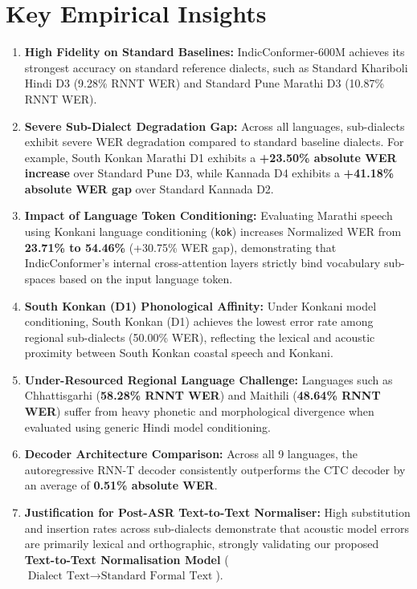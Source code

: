 \documentclass[10pt]{article}
\begin{document}
\section*{Key Empirical Insights}

\begin{enumerate}
  \item \textbf{High Fidelity on Standard Baselines:} IndicConformer-600M achieves its strongest accuracy on standard reference dialects, such as Standard Khariboli Hindi D3 (9.28\% RNNT WER) and Standard Pune Marathi D3 (10.87\% RNNT WER).
  \item \textbf{Severe Sub-Dialect Degradation Gap:} Across all languages, sub-dialects exhibit severe WER degradation compared to standard baseline dialects. For example, South Konkan Marathi D1 exhibits a \textbf{+23.50\% absolute WER increase} over Standard Pune D3, while Kannada D4 exhibits a \textbf{+41.18\% absolute WER gap} over Standard Kannada D2.
  \item \textbf{Impact of Language Token Conditioning:} Evaluating Marathi speech using Konkani language conditioning (\texttt{kok}) increases Normalized WER from \textbf{23.71\% to 54.46\%} (+30.75\% WER gap), demonstrating that IndicConformer's internal cross-attention layers strictly bind vocabulary sub-spaces based on the input language token.
  \item \textbf{South Konkan (D1) Phonological Affinity:} Under Konkani model conditioning, South Konkan (D1) achieves the lowest error rate among regional sub-dialects (50.00\% WER), reflecting the lexical and acoustic proximity between South Konkan coastal speech and Konkani.
  \item \textbf{Under-Resourced Regional Language Challenge:} Languages such as Chhattisgarhi (\textbf{58.28\% RNNT WER}) and Maithili (\textbf{48.64\% RNNT WER}) suffer from heavy phonetic and morphological divergence when evaluated using generic Hindi model conditioning.
  \item \textbf{Decoder Architecture Comparison:} Across all 9 languages, the autoregressive RNN-T decoder consistently outperforms the CTC decoder by an average of \textbf{0.51\% absolute WER}.
  \item \textbf{Justification for Post-ASR Text-to-Text Normaliser:} High substitution and insertion rates across sub-dialects demonstrate that acoustic model errors are primarily lexical and orthographic, strongly validating our proposed \textbf{Text-to-Text Normalisation Model} ($\text{Dialect Text} \rightarrow \text{Standard Formal Text}$).
\end{enumerate}
\end{document}
